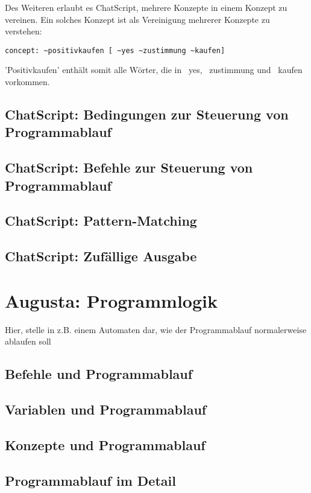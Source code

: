 Des Weiteren erlaubt es ChatScript, mehrere Konzepte in einem Konzept zu vereinen. Ein solches Konzept ist als Vereinigung mehrerer Konzepte zu verstehen:

\begin{lstlisting}[caption={Konzept 'positivkaufen' aus konzepte.top}]
concept: ~positivkaufen [ ~yes ~zustimmung ~kaufen]
\end{lstlisting}

'Positivkaufen' enthält somit alle Wörter, die in ~yes, ~zustimmung und ~kaufen vorkommen. 


\section{ChatScript: Bedingungen zur Steuerung von Programmablauf}
\label{sec:ChatScript: Bedingungen zur Steuerung von Programmablauf}

\section{ChatScript: Befehle zur Steuerung von Programmablauf}
\label{sec:ChatScript: Befehle zur Steuerung von Programmablauf}

\section{ChatScript: Pattern-Matching}
\label{sec:ChatScript: Pattern-Matching}

\section{ChatScript: Zufällige Ausgabe}
\label{sec:ChatScript: Zufällige Ausgabe}

\chapter{Augusta: Programmlogik}
\label{sec:Augusta: Programmlogik}



Hier, stelle in z.B. einem Automaten dar, wie der Programmablauf normalerweise ablaufen soll
\section{Befehle und Programmablauf}
\label{sec:Befehle und Programmablauf}

\section{Variablen und Programmablauf}
\label{sec:Variablen und Programmablauf}

\section{Konzepte und Programmablauf}
\label{sec:Konzepte und Programmablauf}

\section{Programmablauf im Detail}
\label{sec:Programmablauf im Detail}

